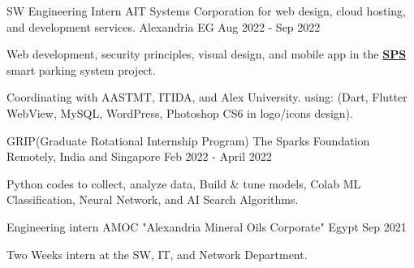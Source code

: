 \begin{cventries}

    \cventry
      {SW Engineering Intern} %
      {AIT Systems Corporation for web design, cloud hosting, and development services.} %
      {Alexandria EG} %
      {Aug 2022 - Sep 2022} %
      {
        \begin{cvitems} %
          \item {Web development, security principles, visual design, and mobile app in the \textbf{\textcolor{cyan}{\href{https://github.com/AsmaaJAH/Smart-Parking-System}{SPS}}} smart parking system project.}
          \item {Coordinating with AASTMT, ITIDA, and Alex University. using: (Dart, Flutter WebView, MySQL, WordPress, Photoshop CS6 in logo/icons design).}
    \end{cvitems}
      }
  
  \end{cventries}
\begin{cventries}

    \cventry
      {GRIP(Graduate Rotational Internship Program)} %
      {The Sparks Foundation} %
      {Remotely, India and Singapore} %
      {Feb 2022 - April 2022} %
      {
        \begin{cvitems} %
          \item {Python codes to collect, analyze data, Build \& tune models, Colab ML Classification, Neural Network, and AI Search Algorithms. }
    \end{cvitems}
      }
  
  \end{cventries}

\begin{cventries}

    \cventry
      {Engineering intern } %
      {AMOC "Alexandria Mineral Oils Corporate"} %
      {Egypt} %
      {Sep 2021} %
      {
        \begin{cvitems} %
          \item {Two Weeks intern at the SW, IT, and Network Department.}
    \end{cvitems}
      }
  
  \end{cventries}


